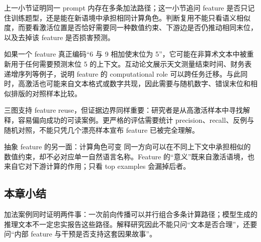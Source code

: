 上一小节证明同一 prompt 内存在多条加法路径；这一小节追问 feature 是否只记住训练题型，还是能在新语境中承担相同计算角色。判断复用不能只看语义相似度，而要看激活位置是否恰好需要同一种数值约束、下游边是否仍推动相同末位，以及去掉该 feature 是否损害预测。

如果一个 feature 真正编码“6 与 9 相加使末位为 5”，它可能在非算术文本中被重新用于任何需要预测末位 5 的上下文。互动论文展示天文测量结束时间、财务表递增序列等例子，说明 feature 的 computational role 可以跨任务迁移。与此同时，高激活也可能来自文本格式或数字共现，因此需要与随机数字、错误末位和相似排版的对照样本比较。




三图支持 feature reuse，但证据边界同样重要：研究者是从高激活样本中寻找解释，容易偏向成功的可读案例。更严格的评估需要统计 precision、recall、反例与随机对照，不能只凭几个漂亮样本宣布 feature 已被完全理解。

\begin{knowledgebox}{抽象 feature 的另一面：计算角色可变}
同一方向可以在不同上下文中承担相似的数值约束，却不必对应单一自然语言名称。Feature 的“意义”既来自激活语境，也来自它对下游计算的作用；只看 top examples 会漏掉后者。
\end{knowledgebox}

\subsection{本章小结}

加法案例同时证明两件事：一次前向传播可以并行组合多条计算路径；模型生成的推理文本不一定忠实报告这些路径。解释研究因此不能只问“文本是否合理”，还要问“内部 feature 与干预是否支持这套因果故事”。

